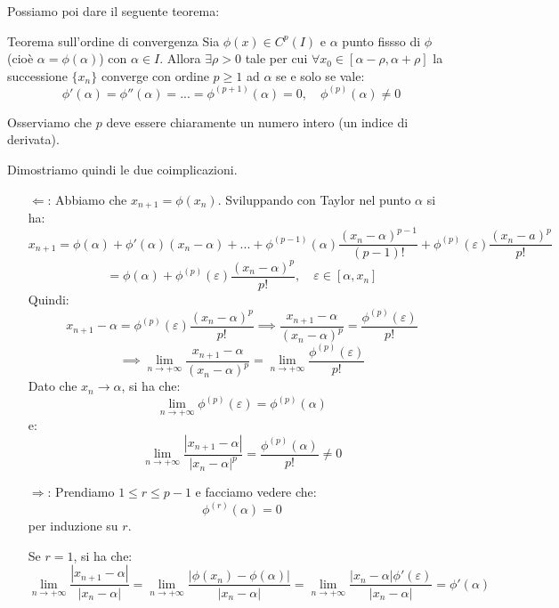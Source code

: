 \documentclass[a4paper,11pt]{article}
\begin{document}
Possiamo poi dare il seguente teorema:
\begin{theorem}{Teorema sull'ordine di convergenza}
	Sia $\phi(x) \in C^p (I)$ e $\alpha$ punto fissso di $\phi$ (cioè $\alpha = \phi(\alpha)$) con $\alpha \in I$.
	Allora $\exists \rho > 0$ tale per cui $\forall x_0 \in [\alpha - \rho, \alpha + \rho]$ la successione $\{x_n\}$ converge con ordine $p \geq 1$ ad $\alpha$ se e solo se vale:
	$$
	\phi'(\alpha) = \phi''(\alpha) = ... = \phi^{(p + 1)}(\alpha) = 0, \quad \phi^{(p)}(\alpha) \neq 0
	$$
\end{theorem}

Osserviamo che $p$ deve essere chiaramente un numero intero (un indice di derivata).

Dimostriamo quindi le due coimplicazioni.
\begin{itemize}
	\item[$\Leftarrow$:] Abbiamo che $x_{n + 1} = \phi(x_n)$. Sviluppando con Taylor nel punto $\alpha$ si ha:
		$$
		x_{n + 1} = \phi(\alpha) + \phi'(\alpha)(x_n - \alpha) + ... + \phi^{(p - 1)}(\alpha) \frac{(x_n - \alpha)^{p - 1}}{(p - 1)!} + \phi^{(p)}(\varepsilon) \frac{(x_n - a)^p}{p!}
		$$
		$$
		= \phi(\alpha) + \phi^{(p)}(\varepsilon) \frac{(x_n - \alpha)^p}{p!}, \quad \varepsilon \in [\alpha, x_n]
		$$
		Quindi:
		$$
		x_{n + 1} - \alpha = \phi^{(p)} (\varepsilon) \frac{(x_n - \alpha)^p}{p!}
		\implies
		\frac{x_{n + 1} - \alpha}{(x_n - \alpha)^p} = \frac{\phi^{(p)}(\varepsilon)}{p!} 
		$$
		$$
		\implies
		\lim_{n \rightarrow + \infty} \frac{x_{n + 1} - \alpha}{(x_n - \alpha)^p} = \lim_{n \rightarrow +\infty} \frac{\phi^{(p)}(\varepsilon)}{p!} 
		$$
		Dato che $x_n \rightarrow \alpha$, si ha che:
		$$
		\lim_{n \rightarrow +\infty} \phi^{(p)} (\varepsilon) = \phi^{(p)} (\alpha)
		$$
		e:
		$$
		\lim_{n \rightarrow +\infty} \frac{|x_{n + 1} - \alpha|}{|x_n - \alpha|^p} = \frac{\phi^{(p)} (\alpha)}{p!} \neq 0
		$$

	\item[$\Rightarrow$:] Prendiamo $1 \leq r \leq p - 1$ e facciamo vedere che:
		$$
			\phi^{(r)} (\alpha) = 0
		$$
		per induzione su $r$.

		Se $r = 1$, si ha che:
		$$
	 	\lim_{n \rightarrow +\infty} \frac{|x_{n + 1} - \alpha|}{|x_n - \alpha|} = \lim_{n \rightarrow +\infty} \frac{|\phi(x_n) - \phi(\alpha)|}{|x_n - \alpha|} = \lim_{n \rightarrow + \infty} \frac{ |x_n - \alpha| \phi'(\varepsilon) }{|x_n - \alpha|} = \phi'(\alpha)
		$$


\end{itemize}
\end{document}
